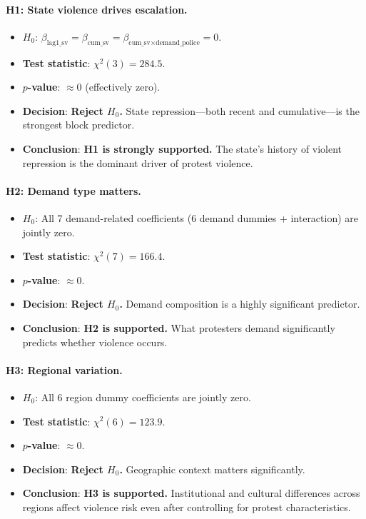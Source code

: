 \documentclass[12pt,a4paper]{article}
\begin{document}
\paragraph{H1: State violence drives escalation.}
\begin{itemize}
  \item $H_0$: $\beta_{\text{lag1\_sv}} = \beta_{\text{cum\_sv}} = \beta_{\text{cum\_sv} \times \text{demand\_police}} = 0$.
  \item \textbf{Test statistic}: $\chi^2(3) = 284.5$.
  \item \textbf{$p$-value}: $\approx 0$ (effectively zero).
  \item \textbf{Decision}: \textbf{Reject $H_0$.} State repression---both recent and cumulative---is the strongest block predictor.
  \item \textbf{Conclusion}: \textbf{H1 is strongly supported.} The state's history of violent repression is the dominant driver of protest violence.
\end{itemize}

\paragraph{H2: Demand type matters.}
\begin{itemize}
  \item $H_0$: All 7 demand-related coefficients (6 demand dummies + interaction) are jointly zero.
  \item \textbf{Test statistic}: $\chi^2(7) = 166.4$.
  \item \textbf{$p$-value}: $\approx 0$.
  \item \textbf{Decision}: \textbf{Reject $H_0$.} Demand composition is a highly significant predictor.
  \item \textbf{Conclusion}: \textbf{H2 is supported.} What protesters demand significantly predicts whether violence occurs.
\end{itemize}

\paragraph{H3: Regional variation.}
\begin{itemize}
  \item $H_0$: All 6 region dummy coefficients are jointly zero.
  \item \textbf{Test statistic}: $\chi^2(6) = 123.9$.
  \item \textbf{$p$-value}: $\approx 0$.
  \item \textbf{Decision}: \textbf{Reject $H_0$.} Geographic context matters significantly.
  \item \textbf{Conclusion}: \textbf{H3 is supported.} Institutional and cultural differences across regions affect violence risk even after controlling for protest characteristics.
\end{itemize}
\end{document}
